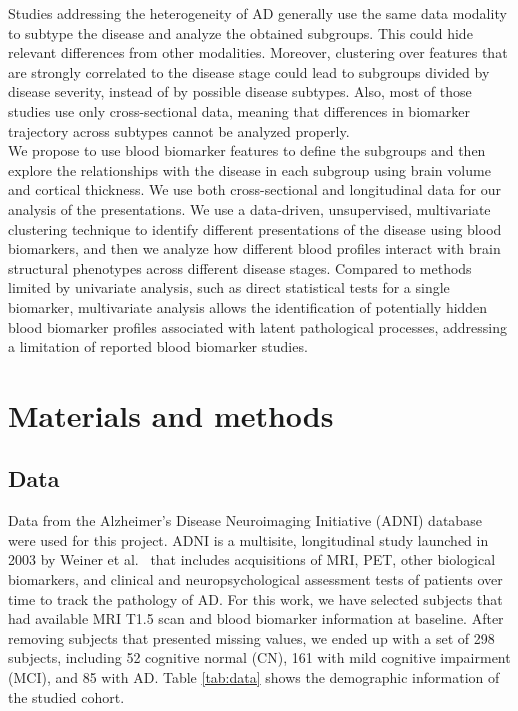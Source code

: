 Studies addressing the heterogeneity of AD generally use the same data modality to subtype the disease and analyze the obtained subgroups. This could hide relevant differences from other modalities. Moreover, clustering over features that are strongly correlated to the disease stage could lead to subgroups divided by disease severity, instead of by possible disease subtypes. Also, most of those studies use only cross-sectional data, meaning that differences in biomarker trajectory across subtypes cannot be analyzed properly. \\

We propose to use blood biomarker features to define the subgroups and then explore the relationships with the disease in each subgroup using brain volume and cortical thickness. We use both cross-sectional and longitudinal data for our analysis of the presentations. We use a data-driven, unsupervised, multivariate clustering technique \cite{Ramazzotti2018} to identify different presentations of the disease using blood biomarkers, and then we analyze how different blood profiles interact with brain structural phenotypes across different disease stages. Compared to methods limited by univariate analysis, such as direct statistical tests for a single biomarker, multivariate analysis allows the identification of potentially hidden blood biomarker profiles associated with latent pathological processes, addressing a limitation of reported blood biomarker studies. \\


\section{Materials and methods}
\subsection*{Data}
\label{data}

Data from the Alzheimer's Disease Neuroimaging Initiative (ADNI) database were used for this project. ADNI is a multisite, longitudinal study launched in 2003 by Weiner et al.\ \cite{Mueller2005} that includes acquisitions of MRI, PET, other biological biomarkers, and clinical and neuropsychological assessment tests of patients over time to track the pathology of AD. For this work, we have selected subjects that had available  MRI T1.5 scan and blood biomarker information at baseline. After removing subjects that presented missing values, we ended up with a set of 298 subjects, including 52 cognitive normal (CN), 161 with mild cognitive impairment (MCI), and 85 with AD. Table \ref{tab:data} shows the demographic information of the studied cohort. \\

